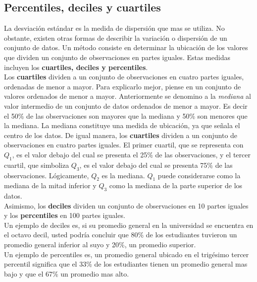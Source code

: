 \documentclass[]{article}
\begin{document}
\subsection{Percentiles, deciles y cuartiles}
La desviación estándar es la medida de dispersión que mas se utiliza. No obstante, existen otras formas de describir la variación o dispersión de un conjunto de datos. Un método consiste en determinar la ubicación de los valores que dividen un conjunto de observaciones en partes iguales. Estas medidas incluyen los \textbf{cuartiles, deciles y percentiles}.\\
Los \textbf{cuartiles} dividen a un conjunto de observaciones en cuatro partes iguales, ordenadas de menor a mayor. Para explicarlo mejor, piense en un conjunto de valores ordenados de menor a mayor. Anteriormente se denomino a la \textit{mediana} al valor intermedio de un conjunto de datos ordenados de menor a mayor. Es decir el 50\% de las observaciones son mayores que la mediana y 50\% son menores que la mediana. La mediana constituye una medida de ubicación, ya que señala el centro de los datos. De igual manera, los \textbf{cuartiles} dividen a un conjunto de observaciones en cuatro partes iguales. El primer cuartil, que se representa con $Q_{1}$, es el valor debajo del cual se presenta el 25\% de las observaciones, y el tercer cuartil, que simboliza $Q_{3}$, es el valor debajo del cual se presenta 75\% de las observaciones. Lógicamente, $Q_{2}$ es la mediana. $Q_{1}$ puede considerarse  como la mediana de la mitad inferior y $Q_{3}$ como la mediana de la parte superior de los datos. \\
Asimismo, los \textbf{deciles} dividen un conjunto de observaciones en 10 partes iguales y los \textbf{percentiles} en 100 partes iguales.\\Un ejemplo de deciles es, si su promedio general en la universidad se encuentra en el octavo decil, usted podría concluir que 80\% de los estudiantes tuvieron un promedio general inferior al suyo y 20\%, un promedio superior. \\ Un ejemplo de percentiles es, un promedio general ubicado en el trigésimo tercer percentil significa que el 33\% de los estudiantes tienen un promedio general mas bajo y que el 67\% un promedio mas alto.
\end{document}
